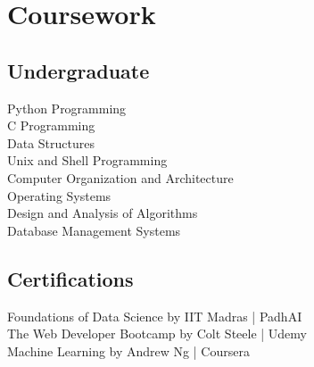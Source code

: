 \documentclass[]{deedy-resume-openfont}
\begin{document}
\begin{minipage}[t]{0.33\textwidth}

\section{Coursework}
\subsection{Undergraduate}
Python Programming \\
C Programming \\
Data Structures \\
Unix and Shell Programming \\
Computer Organization and Architecture \\
Operating Systems \\
Design and Analysis of Algorithms \\
Database Management Systems \\
\sectionsep

\subsection{Certifications}
Foundations of Data Science by IIT Madras | PadhAI \\
The Web Developer Bootcamp by Colt Steele | Udemy \\
Machine Learning by Andrew Ng | Coursera \\


%
%

\end{minipage} 
\hfill
\end{document}

